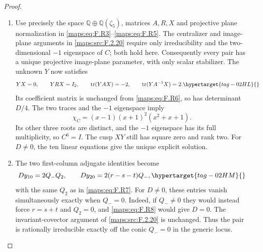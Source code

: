 \documentclass[11pt,a4paper]{article}
\numberwithin{equation}{section}
\theoremstyle{definition}
\begin{document}
\begin{proof}
\begin{enumerate}[label=\arabic*.]
\item Use precisely the space $\mathbb Q\oplus\mathbb Q(\zeta_5)$,
matrices $A,R,X$ and projective plane normalization in
\eqref{maps:eq:F.R3}--\eqref{maps:eq:F.R5}.  The centralizer and image-plane arguments
in \ref{maps:src:F.2.20} require only irreducibility and the two-dimensional
$-1$ eigenspace of $C$; both hold here.
Consequently every pair has a unique projective image-plane
parameter, with only scalar stabilizer.
The unknown $Y$ now satisfies
\begin{equation}
 YX=0,\qquad YRX=I_2,\qquad
 \operatorname{tr}(YAX)=-2,\qquad
 \operatorname{tr}(YA^{-1}X)=2.
 \hypertarget{tag-02HL}{}\label{maps:eq:F.R11}
\end{equation}
Its coefficient matrix is unchanged from \eqref{maps:eq:F.R6}, so has
determinant $D/4$.
The two traces and the $-1$ eigenspace imply
\[
 \chi_C=(x-1)(x+1)^2(x^2+x+1).
\]
Its other three roots are distinct, and the $-1$ eigenspace
has its full multiplicity, so $C^6=I$.
The cusp $XY$ still has square zero and rank two.
For $D\ne0$, the ten linear equations give the unique
explicit solution.

\item The two first-column adjugate identities become
\begin{equation}
 D y_{10}=2Q_-Q_2,
 \qquad D y_{20}=2(r-s-t)Q_-,
 \hypertarget{tag-02HM}{}\label{maps:eq:F.R12}
\end{equation}
with the same $Q_2$ as in \eqref{maps:eq:F.R7}.
For $D\ne0$, these entries vanish simultaneously exactly
when $Q_-=0$.
Indeed, if $Q_-\ne0$ they would instead force
$r=s+t$ and $Q_2=0$, and \eqref{maps:eq:F.R8} would give $D=0$.
The invariant-covector argument of \ref{maps:src:F.2.20} is unchanged.
Thus the pair is rationally irreducible exactly off the
conic $Q_-=0$ in the generic locus.


\end{enumerate}
\end{proof}
\end{document}
